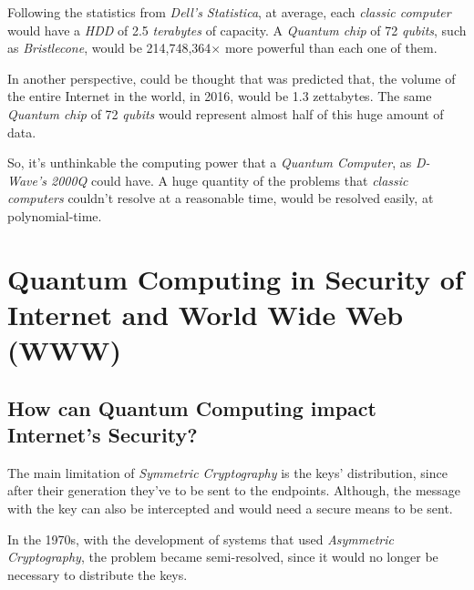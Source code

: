 \documentclass[conference]{IEEEtran}
\begin{document}
\newpage

Following the statistics from \textit{Dell's Statistica}, at average, each \textit{classic computer} would have a \textit{HDD} of 2.5 \textit{terabytes} of capacity. A \textit{Quantum chip} of 72 \textit{qubits}, such as \textit{Bristlecone}, would be 214,748,364$\times$ more powerful than each one of them.

\vspace{4pt}

In another perspective, could be thought that was predicted that, the volume of the entire Internet in the world, in 2016, would be 1.3 zettabytes. The same \textit{Quantum chip} of 72 \textit{qubits} would represent almost half of this huge amount of data.

\vspace{4pt}

So, it's unthinkable the computing power that a \textit{Quantum Computer}, as \textit{D-Wave's 2000Q} could have. A huge quantity of the problems that \textit{classic computers} couldn't resolve at a reasonable time, would be resolved easily, at polynomial-time.

\vspace{6pt}

\section{Quantum Computing in Security of Internet and World Wide Web (WWW)}

\vspace{4pt}

\subsection{How can Quantum Computing impact Internet's Security?}\label{AA}

\vspace{4pt}

The main limitation of \textit{Symmetric Cryptography} is the keys' distribution, since after their generation they've to be sent to the endpoints. Although, the message with the key can also be intercepted and would need a secure means to be sent.

\vspace{4pt}

In the 1970s, with the development of systems that used \textit{Asymmetric Cryptography}, the problem became semi-resolved, since it would no longer be necessary to distribute the keys.
\end{document}
